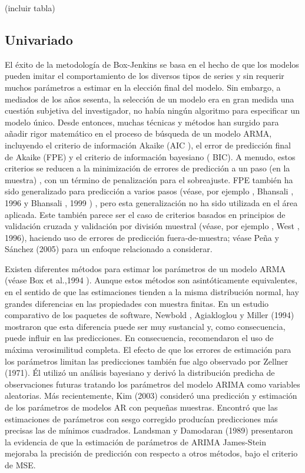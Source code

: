 \documentclass{llncs}
\begin{document}
(incluir tabla)

\subsection{Univariado}

El éxito de la metodología de Box-Jenkins se basa en el hecho de que los modelos pueden imitar el comportamiento de los diversos tipos de series y sin requerir muchos parámetros a estimar en la elección final del modelo. Sin embargo, a mediados de los años sesenta, la selección de un modelo era en gran medida una cuestión subjetiva del investigador, no había ningún algoritmo para especificar un modelo único. Desde entonces, muchas técnicas y métodos han surgido para añadir rigor matemático en el proceso de búsqueda de un modelo ARMA, incluyendo el criterio de información Akaike (AIC ), el error de predicción final de Akaike (FPE) y el criterio de información bayesiano ( BIC). A menudo, estos criterios se reducen a la minimización de errores de predicción a un paso (en la muestra) , con un término de penalización para el sobreajuste. FPE también ha sido generalizado para predicción a varios pasos (véase, por ejemplo , Bhansali , 1996 \cite{Bhansali1996577} y Bhansali , 1999 \cite{Bhansali1999295}) , pero esta generalización no ha sido utilizada en el área aplicada. Este también parece ser el caso de criterios basados en principios de validación cruzada y validación por división muestral (véase, por ejemplo , West , 1996), haciendo uso de errores de predicción fuera-de-muestra; véase Peña y Sánchez (2005) para un enfoque relacionado a considerar.

Existen diferentes métodos para estimar los parámetros de un modelo ARMA (véase Box et al.,1994 \cite{Box1994}). Aunque estos métodos son asintóticamente equivalentes, en el sentido de que las estimaciones tienden a la misma distribución normal, hay grandes diferencias en las propiedades con muestra finitas. En un estudio comparativo de los paquetes de software, Newbold , Agiakloglou y Miller (1994)  \cite{-}mostraron que esta diferencia puede ser muy sustancial y, como consecuencia, puede influir en las predicciones. En consecuencia, recomendaron el uso de máxima verosimilitud completa. El efecto de que los errores de estimación para los parámetros limitan las predicciones también fue algo observado por Zellner (1971). Él utilizó un análisis bayesiano y derivó la distribución predicha de observaciones futuras tratando los parámetros del modelo ARIMA como variables aleatorias. Más recientemente,  Kim (2003) \cite{-} consideró una predicción y estimación de los parámetros de modelos AR con pequeñas muestras. Encontró que las estimaciones de parámetros con sesgo corregido producían predicciones más precisas las de mínimos cuadrados. Landsman y Damodaran (1989) \cite{-} presentaron la evidencia de que la estimación de parámetros de ARIMA James-Stein mejoraba la precisión de predicción con respecto a otros métodos, bajo el criterio de MSE.
\end{document}
